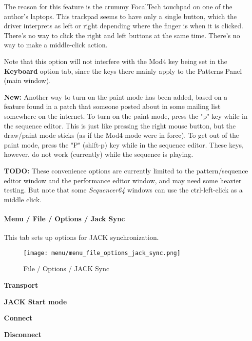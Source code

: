    The reason for this feature is the crummy FocalTech touchpad on one of
   the author's laptops.  This trackpad seems to have only a single button,
   which the driver interprets as left or right depending where the finger
   is when it is clicked.  There's no way to click the right and left
   buttons at the same time.  There's no way to make a middle-click action.

   Note that this option will not interfere with the Mod4 key being set
   in the \textbf{Keyboard} option tab, since the keys there mainly apply to
   the Patterns Panel (main window).


   \textbf{New:}
   Another way to turn on the paint mode has been added, based on a feature
   found in a patch that someone posted about in some mailing list somewhere on
   the internet.
   To turn on the paint mode, press the
   "p" key while in the sequence editor.
   This is just like pressing the right mouse button, but the draw/paint mode
   sticks (as if the Mod4 mode were in force).
   To get out of the paint mode, press the
   "P" (shift-p) key while in the sequence editor.
   These keys, however, do not work (currently) while the sequence is playing.

   \textbf{TODO:} These convenience options are currently limited to the
   pattern/sequence editor window and the performance editor window, and may
   need some heavier testing.  But note that some \textsl{Sequencer64} windows
   can use the ctrl-left-click as a middle click. 

\paragraph{Menu / File / Options / Jack Sync}
\label{paragraph:seq64_menu_file_options_jack_sync}

   This tab sets up options for JACK synchronization.

\begin{figure}[H]
   \centering 
   \texttt{[image: menu/menu\_file\_options\_jack\_sync.png]}
   \caption{File / Options / JACK Sync}
   \label{fig:seq64_menu_file_options_jack_sync}
\end{figure}

   \begin{enumber}
      \item \textbf{Transport}
      \item \textbf{JACK Start mode}
      \item \textbf{Connect}
      \item \textbf{Disconnect}
   \end{enumber}


